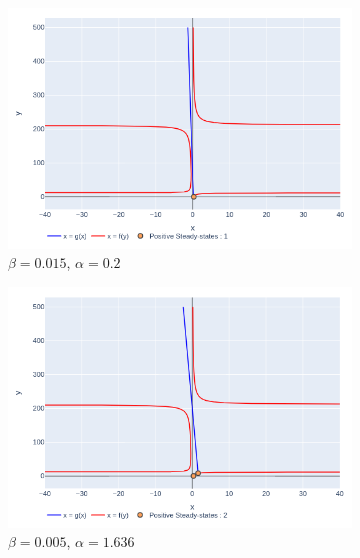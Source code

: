\documentclass[12pt]{article}
\begin{document}
\begin{figure}[!ht]
    \centering
    \begin{subfigure}[b]{0.49\textwidth}
         \centering
         \includegraphics[width=\textwidth]{../figures/fig_isocline_2.png}
         \caption{$\beta = 0.015$, $\alpha=0.2$}
         \label{fig::nuclline 1 ss}
     \end{subfigure}
     \hfill
    \begin{subfigure}[b]{0.49\textwidth}
         \centering
         \includegraphics[width=\textwidth]{../figures/fig_isocline_1.png}
         \caption{$\beta = 0.005$, $\alpha=1.636$}
         \label{fig::nuclline 2 ss}
     \end{subfigure}\\
     \begin{subfigure}[b]{0.49\textwidth}

\end{subfigure}
\end{figure}
\end{document}
